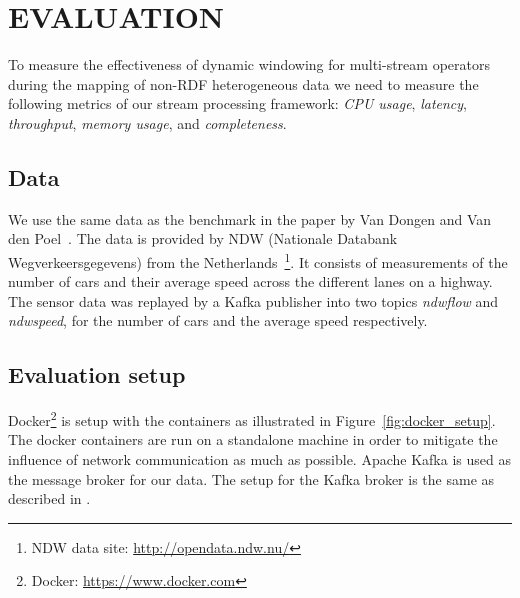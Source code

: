 \section{EVALUATION}
\label{chap:Evaluation}

To measure the effectiveness of dynamic windowing for multi-stream operators during the 
mapping of non-RDF heterogeneous data we need to measure the following 
metrics of our stream processing framework: \emph{CPU usage}, \emph{latency}, \emph{throughput},
\emph{memory usage}, and \emph{completeness}. 

\subsection{Data}
We use the same data 
as the benchmark in the paper by Van Dongen and Van den Poel~\cite{evalution_of_spe}. 
The data is provided by NDW (Nationale Databank Wegverkeersgegevens) from the 
Netherlands~\footnote{NDW data site: \href{http://opendata.ndw.nu/}{http://opendata.ndw.nu/} }.
It consists of measurements of the number of cars and their average speed across the different 
lanes on a highway. 
The sensor data was replayed by a Kafka publisher into two topics 
\emph{ndwflow} and \emph{ndwspeed}, for the number of cars and the average speed respectively.

\subsection{Evaluation setup}

Docker\footnote{Docker: \url{https://www.docker.com}} is 
setup with the containers 
as illustrated in Figure~\ref{fig:docker_setup}. The docker containers 
are run on a standalone machine in order to mitigate the influence of 
network communication as much as possible. Apache Kafka is used 
as the message broker for our data. The setup for the Kafka broker is 
the same as described in \cite{evalution_of_spe}. 



